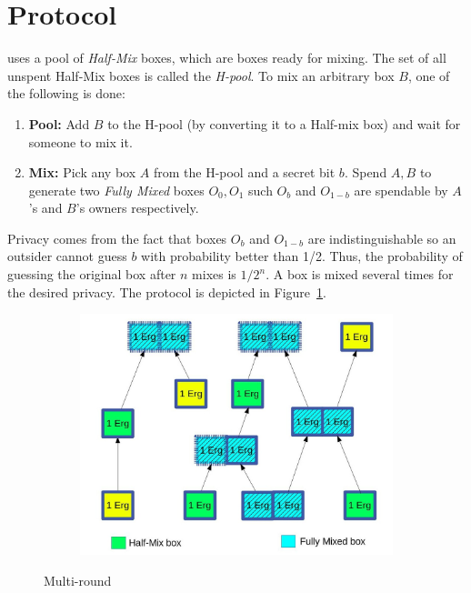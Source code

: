 \documentclass[runningheads]{llncs}
\begin{document}
\section{\algname Protocol}

\algname uses a pool of {\em Half-Mix} boxes, which are boxes ready for mixing. The set of all unspent Half-Mix boxes is called the {\em H-pool}. To mix an arbitrary box $B$, one of the following is done:
\begin{enumerate}
	\item \textbf{Pool:} Add $B$ to the H-pool (by converting it to a Half-mix box) and wait for someone to mix it.
	\item \textbf{Mix:} Pick any box $A$ from the H-pool and a secret bit $b$. Spend $A, B$ to generate two {\em Fully Mixed} boxes $O_0, O_1$ such $O_b$ and $O_{1-b}$ are spendable by $A$'s and $B$'s owners respectively.
\end{enumerate}

Privacy comes from the fact that boxes $O_b$ and $O_{1-b}$ are indistinguishable so an outsider cannot guess $b$ with probability better than 1/2. Thus, the probability of guessing the original box after $n$ mixes is $1/2^n$. A box is mixed several times for the desired privacy. The protocol is depicted in Figure~\ref{fig:mixname}. 

\begin{figure}[h]
	\centering
	\begin{subfigure}{.6\textwidth}
		\centering
		\includegraphics[width=\linewidth]{ErgoMix}
	\end{subfigure}
	\caption{Multi-round \algname}
\label{fig:mixname}
\end{figure}
\end{document}
